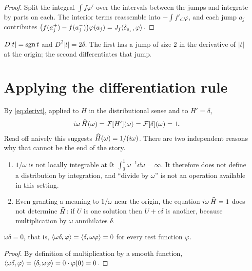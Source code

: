 \begin{proof}
Split the integral $\int f\varphi'$ over the intervals between the jumps and integrate by parts on
each. The interior terms reassemble into $-\int f'_{\mathrm{cl}}\varphi$, and each jump $a_{j}$
contributes $\big(f(a_{j}^{+})-f(a_{j}^{-})\big)\varphi(a_{j})=J_{j}\langle \delta_{a_{j}},\varphi\rangle$.
\end{proof}

\begin{example}\label{ex:abs}
$D|t|=\operatorname{sgn} t$ and $D^{2}|t|=2\delta$. The first has a jump of size $2$ in the derivative of
$|t|$ at the origin; the second differentiates that jump.
\end{example}

\section{Applying the differentiation rule}

By \eqref{eq:derivt}, applied to $H$ in the distributional sense and to $H'=\delta$,
\begin{equation}
i\omega\,\widehat{H}(\omega)=\mathcal{F}[H'](\omega)=\mathcal{F}[\delta](\omega)=1 .
\label{eq:iomegaH}
\end{equation}
Read off naively this suggests $\widehat{H}(\omega)=1/(i\omega)$. There are two independent reasons why
that cannot be the end of the story.

\begin{enumerate}
\item $1/\omega$ is not locally integrable at $0$: $\int_{0}^{1}\omega^{-1}\dd\omega=\infty$. It
therefore does not define a distribution by integration, and ``divide by $\omega$'' is not an
operation available in this setting.
\item Even granting a meaning to $1/\omega$ near the origin, the equation $i\omega\,\widehat{H}=1$ does not
determine $\widehat{H}$: if $U$ is one solution then $U+c\delta$ is another, because multiplication by
$\omega$ annihilates $\delta$.
\end{enumerate}

\begin{proposition}\label{prop:omega-delta}
$\omega\delta=0$, that is, $\langle \omega\delta,\varphi\rangle=\langle \delta,\omega\varphi\rangle=0$ for every
test function $\varphi$.
\end{proposition}

\begin{proof}
By definition of multiplication by a smooth function,
$\langle \omega\delta,\varphi\rangle=\langle \delta,\omega\varphi\rangle=0\cdot\varphi(0)=0$.
\end{proof}

